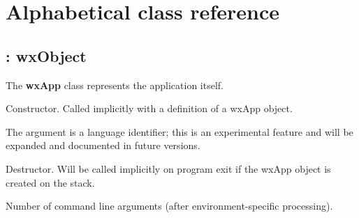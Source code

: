 \chapter{Alphabetical class reference}\label{classref}
%
\setfooter{\thepage}{}{}{}{}{\thepage}%
%



\section{: wxObject}\label{wxapp}


The {\bf wxApp} class represents the application itself.



Constructor. Called implicitly with a definition of a wxApp object.

The argument is a language identifier; this is an experimental
feature and will be expanded and documented in future versions.



Destructor. Will be called implicitly on program exit if the wxApp
object is created on the stack.



Number of command line arguments (after environment-specific processing).

